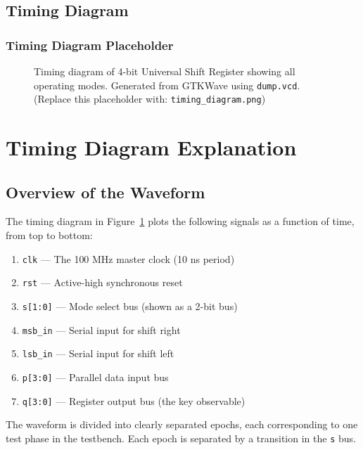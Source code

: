 \documentclass[12pt,a4paper]{report}
\newcommand{\signal}[1]{\texttt{\textcolor{codeblue}{#1}}}
\begin{document}
\section{Timing Diagram}

\subsection{Timing Diagram Placeholder}

\begin{figure}[H]
    \centering
    \fbox{\rule{0pt}{9cm}\rule{14cm}{0pt}}
    \caption{Timing diagram of 4-bit Universal Shift Register showing all operating modes. Generated from GTKWave using \texttt{dump.vcd}. (Replace this placeholder with: \texttt{timing\_diagram.png})}
    \label{fig:timing}
\end{figure}

\chapter{Timing Diagram Explanation}

\section{Overview of the Waveform}

The timing diagram in Figure~\ref{fig:timing} plots the following signals as a function of time, from top to bottom:
\begin{enumerate}
    \item \signal{clk} — The 100 MHz master clock (10 ns period)
    \item \signal{rst} — Active-high synchronous reset
    \item \signal{s[1:0]} — Mode select bus (shown as a 2-bit bus)
    \item \signal{msb\_in} — Serial input for shift right
    \item \signal{lsb\_in} — Serial input for shift left
    \item \signal{p[3:0]} — Parallel data input bus
    \item \signal{q[3:0]} — Register output bus (the key observable)
\end{enumerate}

The waveform is divided into clearly separated epochs, each corresponding to one test phase in the testbench. Each epoch is separated by a transition in the \signal{s} bus.
\end{document}
